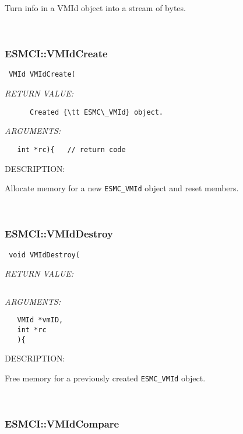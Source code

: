       Turn info in a VMId object into a stream of bytes.
   
 
\mbox{}\hrulefill\
 
\subsubsection [ESMCI::VMIdCreate] {ESMCI::VMIdCreate}


  
\begin{verbatim} VMId VMIdCreate(\end{verbatim}{\em RETURN VALUE:}
\begin{verbatim}      Created {\tt ESMC\_VMId} object.\end{verbatim}{\em ARGUMENTS:}
\begin{verbatim}   int *rc){   // return code\end{verbatim}
{\sf DESCRIPTION:\\ }


      Allocate memory for a new {\tt ESMC\_VMId} object and reset members.
   
 
\mbox{}\hrulefill\
 
\subsubsection [ESMCI::VMIdDestroy] {ESMCI::VMIdDestroy}


  
\begin{verbatim} void VMIdDestroy(\end{verbatim}{\em RETURN VALUE:}
\begin{verbatim} \end{verbatim}{\em ARGUMENTS:}
\begin{verbatim}   VMId *vmID,
   int *rc
   ){\end{verbatim}
{\sf DESCRIPTION:\\ }


      Free memory for a previously created {\tt ESMC\_VMId} object.
   
 
\mbox{}\hrulefill\
 
\subsubsection [ESMCI::VMIdCompare] {ESMCI::VMIdCompare}



